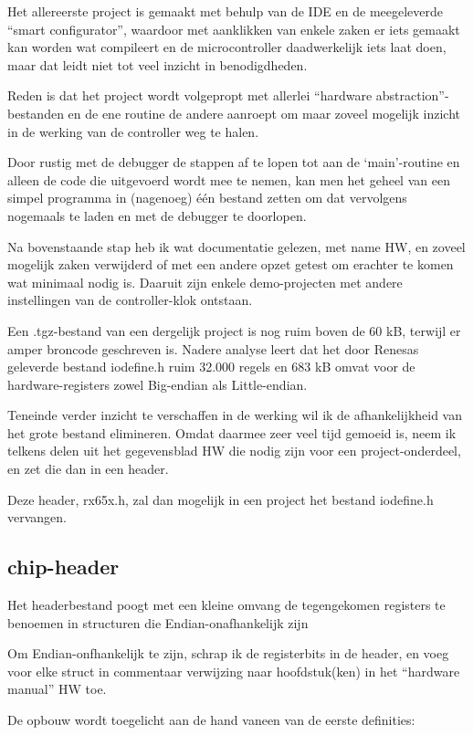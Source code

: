\documentclass[a4paper, 11pt, fleqn, twoside]{scrartcl}%
\begin{document}
Het allereerste project is gemaakt met behulp van de IDE en de meegeleverde
``smart configurator'', waardoor met aanklikken van enkele zaken er iets
gemaakt kan worden wat compileert en de microcontroller daadwerkelijk iets
laat doen, maar dat leidt niet tot veel inzicht in benodigdheden.

Reden is dat het project wordt volgepropt met allerlei ``hardware 
abstraction''-bestanden en de ene routine de andere aanroept om maar 
zoveel mogelijk inzicht in de werking van de controller weg te halen.

Door rustig met de debugger de stappen af te lopen tot aan de `main'-routine
en alleen de code die uitgevoerd wordt mee te nemen, kan men het geheel van
een simpel programma in (nagenoeg) \'e\'en bestand zetten om dat vervolgens
nogemaals te laden en met de debugger te doorlopen.

Na bovenstaande stap heb ik wat documentatie gelezen, met name HW, en zoveel 
mogelijk zaken verwijderd of met een andere opzet getest om erachter te 
komen wat minimaal nodig is. Daaruit zijn enkele demo-projecten met andere
instellingen van de controller-klok ontstaan.

Een .tgz-bestand van een dergelijk project is nog ruim boven de 60 kB, terwijl 
er amper broncode geschreven is. Nadere analyse leert dat het door Renesas 
geleverde bestand iodefine.h ruim 32.000 regels en 683 kB omvat voor de 
hardware-registers zowel Big-endian als Little-endian.

Teneinde verder inzicht te verschaffen in de werking wil ik de afhankelijkheid
van het grote bestand elimineren. Omdat daarmee zeer veel tijd gemoeid is,
neem ik telkens delen uit het gegevensblad HW die nodig zijn voor een 
project-onderdeel, en zet die dan in een header.

Deze header, rx65x.h, zal dan mogelijk in een project het bestand iodefine.h vervangen.

\subsection{chip-header}
Het headerbestand poogt met een kleine omvang de tegengekomen registers te
benoemen in structuren die Endian-onafhankelijk zijn

Om Endian-onfhankelijk te zijn, schrap ik de registerbits in de header, en 
voeg voor elke struct in commentaar verwijzing naar hoofdstuk(ken) in het
``hardware manual'' HW toe.

De opbouw wordt toegelicht aan de hand vaneen van de eerste definities:
\end{document}
